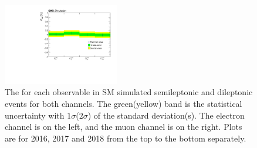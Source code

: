 \begin{figure}
    \includegraphics[width=0.45\textwidth]{figure/SimAcp_18_mu_ttbar_chi2_20_opt_150.pdf}
    \caption[The \Acpprime for each observable in SM simulated semileptonic and dileptonic \ttbar events.]
    {
        The \Acpprime for each observable in SM simulated semileptonic and dileptonic \ttbar events for both channels.
        The green(yellow) band is the statistical uncertainty with $1\sigma$($2\sigma$) of the standard deviation(s).
        The electron channel is on the left, and the muon channel is on the right.
        Plots are for 2016, 2017 and 2018 from the top to the bottom separately.
    }
    \label{fig:simulated_signal_acp}
\end{figure}

